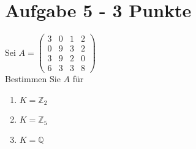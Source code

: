 \documentclass[a4paper]{article}
\begin{document}
 \section*{Aufgabe 5 - 3 Punkte}
Sei $A = \begin{pmatrix}
3 & 0&1&2\\
0&9&3&2\\
3&9&2&0 \\
6&3&3&8
\end{pmatrix}$\\
Bestimmen Sie $A$ für 
  \begin{enumerate}[label=(\alph*)]
\item $K = \mathbb{Z}_2$

\item $K = \mathbb{Z}_5$

\item $K = \mathbb{Q}$  
  
 \end{enumerate}
\end{document}
